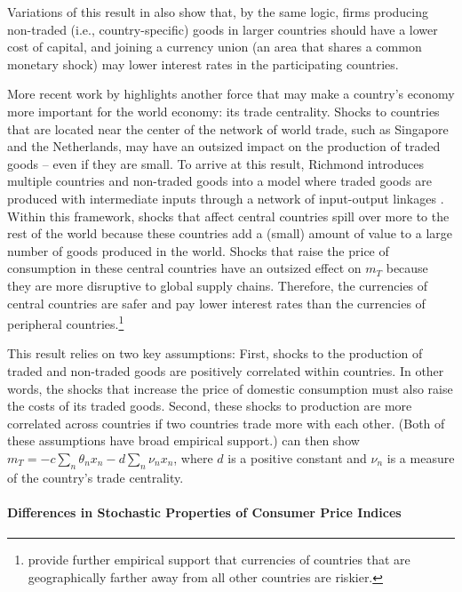 \documentclass{ar-1col}
\begin{document}
Variations of this result in \citet{Hassan2013} also show that, by the same logic, firms producing non-traded (i.e., country-specific) goods in larger countries should have a lower cost of capital, and joining a currency union (an area that shares a common monetary shock) may lower interest rates in the participating countries.

More recent work by \citet{Richmond2019} highlights another force that may make a country's economy more important for the world economy: its trade centrality. Shocks to countries that are located near the center of the network of world trade, such as Singapore and the Netherlands, may have an outsized impact on the production of traded goods -- even if they are small. To arrive at this result, Richmond introduces multiple countries and non-traded goods into a model where traded goods are produced with intermediate inputs through a network of input-output linkages \citep{LongPlosser1983, Acemogluetal2012}. Within this framework, shocks that affect central countries spill over more to the rest of the world because these countries add a (small) amount of value to a large number of goods produced in the world. Shocks that raise the price of consumption in these central countries have an outsized effect on  $m_T$ because they are more disruptive to global supply chains. Therefore, the currencies of central countries are safer and pay lower interest rates than the currencies of peripheral countries.\footnote{\citet{LustigRichmond2020} provide further empirical support that currencies of countries that are geographically farther away from all other countries are riskier.}   

This result relies on two key assumptions: First, shocks to the production of traded and non-traded goods are positively correlated within countries. In other words, the shocks that increase the price of domestic consumption must also raise the costs of its traded goods. Second, these shocks to production are more correlated across countries if two countries trade more with each other. (Both of these assumptions have broad empirical support.) \citet{Richmond2019} can then show $m_{T} = -c \sum_{n} \theta_n x_n- d\sum_{n} \nu_n x_n$, where $d$ is a positive constant and $\nu_n$ is a measure of the country's trade centrality.


\paragraph*{Differences in Stochastic Properties of Consumer Price Indices}
\end{document}
